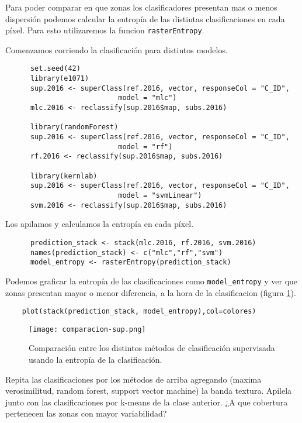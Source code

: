 Para poder comparar en que zonas los clasificadores presentan mas o menos dispersi\'on podemos calcular la entrop\'ia de las distintas clasificaciones en cada p\'ixel. Para esto utilizaremos la funcion \texttt{rasterEntropy}.

\begin{exa}
  Comenzamos corriendo la clasificaci\'on para distintos modelos.

  \begin{lstlisting}
      set.seed(42)
      library(e1071)
      sup.2016 <- superClass(ref.2016, vector, responseCol = "C_ID",
                           model = "mlc")
      mlc.2016 <- reclassify(sup.2016$map, subs.2016)

      library(randomForest)
      sup.2016 <- superClass(ref.2016, vector, responseCol = "C_ID",
                           model = "rf")
      rf.2016 <- reclassify(sup.2016$map, subs.2016)

      library(kernlab)
      sup.2016 <- superClass(ref.2016, vector, responseCol = "C_ID",
                           model = "svmLinear")
      svm.2016 <- reclassify(sup.2016$map, subs.2016)
  \end{lstlisting}

  Los apilamos y calculamos la entrop\'ia en cada p\'ixel.

  \begin{lstlisting}
      prediction_stack <- stack(mlc.2016, rf.2016, svm.2016)
      names(prediction_stack) <- c("mlc","rf","svm")
      model_entropy <- rasterEntropy(prediction_stack)
  \end{lstlisting}

  Podemos graficar la entrop\'ia de las clasificaciones como \verb|model_entropy| y ver que zonas presentan mayor o menor diferencia, a la hora de la clasificacion (figura \ref{fig:entropia}).

  \begin{lstlisting}
    plot(stack(prediction_stack, model_entropy),col=colores)
  \end{lstlisting}

  \begin{figure}[h!]
    \centering
    \texttt{[image: comparacion-sup.png]}
    \caption{Comparaci\'on entre los distintos m\'etodos de clasificaci\'on supervisada usando la entrop\'ia de la clasificaci\'on.}
    \label{fig:entropia}
  \end{figure}

\end{exa}

\begin{act}
  Repita las clasificaciones por los m\'etodos de arriba agregando (maxima verosimilitud, random forest, support vector machine) la banda textura. Apilela junto con las clasificaciones por k-means de la clase anterior. ¿A que cobertura pertenecen las zonas con mayor variabilidad?
\end{act}

